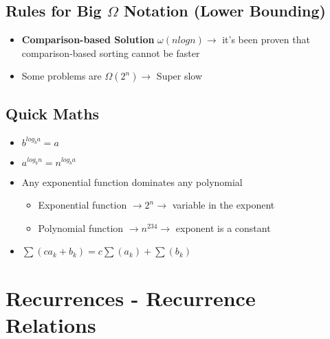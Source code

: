 \documentclass[12pt]{article}
\begin{document}
\subsection*{Rules for Big $\Omega$ Notation (Lower Bounding)}

\begin{itemize}

    \item \textbf{Comparison-based Solution} $\omega(nlogn) \rightarrow$ it's been proven that comparison-based sorting cannot be faster
    
    \item Some problems are $\Omega(2^n) \rightarrow$ Super slow

\end{itemize}


\subsection*{Quick Maths}

\begin{itemize}

    \item $b^{log_ba} = a$

    \item $a^{log_bn} = n^{log_ba}$

    \item Any exponential function dominates any polynomial
    \begin{itemize}
        \item Exponential function $\rightarrow 2^n \rightarrow$ variable in the exponent
        \item Polynomial function $\rightarrow n^{234} \rightarrow$ exponent is a constant
    \end{itemize}

    \item $\sum(ca_k + b_k) = c\sum(a_k) + \sum(b_k)$

\end{itemize}


\section*{Recurrences - Recurrence Relations}
\end{document}
